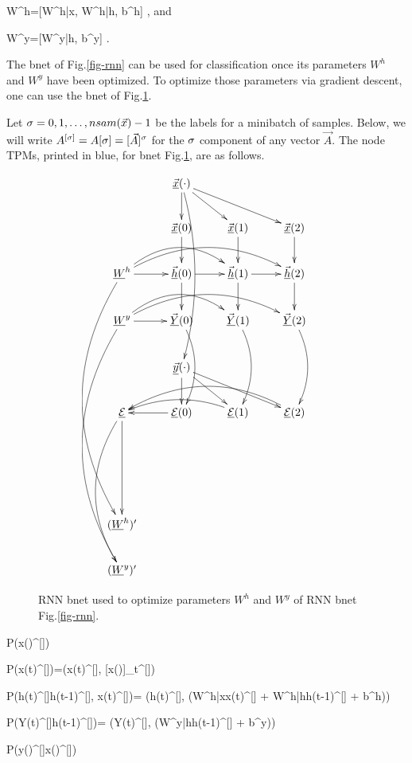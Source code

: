 \beq
W^h=[W^{h|x}, W^{h|h}, b^h]
\;,
\eeq
and

\beq
W^y=[W^{y|h}, b^y]
\;.
\eeq

The bnet of Fig.\ref{fig-rnn}
can be used for
classification once 
its parameters 
$W^h$ and $W^y$
have been optimized.
To optimize
those parameters via gradient
descent,
one can use the bnet 
of Fig.\ref{fig-rnn-ext}.

Let $\sigma=0,1, \ldots, nsam({\vec{x}})-1$
be the labels for a minibatch of samples.
Below, we will write $A^{[\sigma]}=A[\sigma]=[\vec{A}]^\sigma$
for the $\sigma$
component of any vector $\vec{A}$.
The node TPMs,
 printed in blue,
for bnet Fig.\ref{fig-rnn-ext},
 are as follows.



\begin{figure}[h!]
\centering
$$\xymatrix{
&\ranvec{x}(\cdot)\ar[d]\ar[dr]\ar[drr]
\ar@/^1pc/[dddd]
\\
&\vec{\rvx}(0)\ar[d]&
\vec{\rvx}(1)\ar[d]&
\vec{\rvx}(2)\ar[d]\\
\rvW^h\ar[r]\ar@/^2pc/[rr]\ar@/^2pc/[rrr]
\ar@/_3pc/[dddddd]
&\vec{\rvh}(0)\ar[d]\ar[r]&
\vec{\rvh}(1)\ar[d]\ar[r]&
\vec{\rvh}(2)\ar[d]\\
\rvW^y\ar[r]\ar@/^2pc/[rr]\ar@/^2pc/[rrr]
\ar@/_3pc/[dddddd]
&\vec{\rvY}(0)\ar@/^1pc/[dd]&
\vec{\rvY}(1)\ar@/^1pc/[dd]&
\vec{\rvY}(2)\ar@/^1pc/[dd]
\\
&
\ranvec{y}(\cdot)\ar[d]\ar[dr]\ar[drr]
\\
\ul{\cale}\ar[ddd]
\ar@/_2pc/[dddd]&
\ul{\cale}(0)\ar[l]&
\ul{\cale}(1)\ar@/_1pc/[ll]&
\ul{\cale}(2)\ar@/_2pc/[lll]
\\
\\
\\
(\rvW^h)'\\
(\rvW^y)'
}
$$
\caption{RNN bnet used
to optimize parameters $W^h$
and $W^y$ of RNN bnet Fig.\ref{fig-rnn}.}
\label{fig-rnn-ext}
\end{figure}

\beq\color{blue}
P(x(\cdot)^{[\s]})
\eeq

\beq\color{blue}
P(x(t)^{[\s]})=\delta(x(t)^{[\s]},
[x(\cdot)]_t^{[\s]})
\eeq

\beq\color{blue}
P(h(t)^{[\s]}\cond h(t-1)^{[\s]}, x(t)^{[\s]})=
\delta(h(t)^{[\s]},
\cala(W^{h|x}x(t)^{[\s]} + W^{h|h}h(t-1)^{[\s]} + b^h))
\eeq

\beq\color{blue}
P(Y(t)^{[\s]}\cond h(t-1)^{[\s]})=
\delta(Y(t)^{[\s]},
\cala(W^{y|h}h(t-1)^{[\s]} + b^y))
\eeq

\beq\color{blue}
P(y(\cdot)^{[\s]}\cond x(\cdot)^{[\s]})
\eeq

